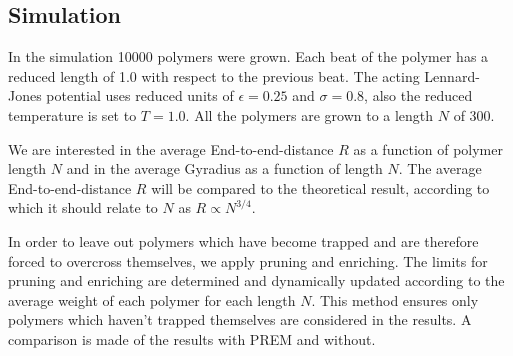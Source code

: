 \subsection*{Simulation}
In the simulation 10000 polymers were grown. Each beat of the polymer has a reduced length of 1.0 with respect to the previous beat. The acting Lennard-Jones potential uses reduced units of $\epsilon=0.25$ and $\sigma=0.8$, also the reduced temperature is set to $T=1.0$. All the polymers are grown to a length $N$ of 300. 

We are interested in the average End-to-end-distance $R$ as a function of polymer length $N$ and in the average Gyradius as a function of length $N$. The average End-to-end-distance $R$ will be compared to the theoretical result, according to which it should relate to $N$ as $R\propto N^{3/4}$.

In order to leave out polymers which have become trapped and are therefore forced to overcross themselves, we apply pruning and enriching. The limits for pruning and enriching are determined and dynamically updated according to the average weight of each polymer for each length $N$. This method ensures only polymers which haven't trapped themselves are considered in the results. A comparison is made of the results with PREM and without.